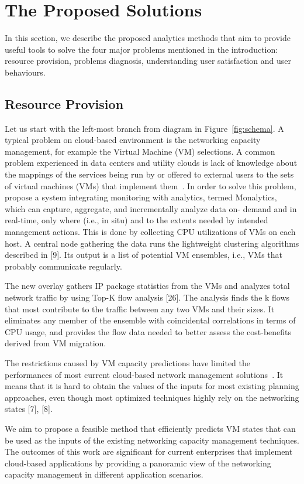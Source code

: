 \section{The Proposed Solutions}
In this section, we describe the proposed analytics methods that aim to provide useful tools to solve the four major problems mentioned in the introduction: resource provision, problems diagnosis, understanding user satisfaction and user behaviours.

\subsection{Resource Provision}
Let us start with the left-most branch from diagram in Figure~\ref{fig:schema}. A typical problem on cloud-based environment is the networking capacity management, for example the Virtual Machine (VM) selections. A common problem experienced in data centers and utility clouds is lack of knowledge about the mappings of the services being run by or offered to external users to the sets of virtual machines (VMs) that implement them~\cite{Wang2011}. In order to solve this problem,  propose a system integrating monitoring with analytics, termed Monalytics, which can capture, aggregate, and incrementally analyze data on- demand and in real-time, only where (i.e., in situ) and to the extents needed by intended management actions. This is done by collecting CPU utilizations of VMs on each host. A central node gathering the data runs the lightweight clustering algorithms described in [9]. Its output is a list of potential VM ensembles, i.e., VMs that probably communicate regularly. 


The new overlay gathers IP package statistics from the VMs and analyzes total network traffic by using Top-K flow analysis [26]. The analysis finds the k flows that most contribute to the traffic between any two VMs and their sizes. It eliminates any member of the ensemble with coincidental correlations in terms of CPU usage, and provides the flow data needed to better assess the cost-benefits derived from VM migration.

 
 
 The restrictions caused by VM capacity predictions have limited the performances of most current cloud-based network management solutions~\cite{Sun2016}. It means that it is hard to obtain the values of the inputs for most existing planning approaches, even though most optimized techniques highly rely on the networking states [7], [8]. 
 
 We aim to propose a feasible method that efficiently predicts VM states that can be used as the inputs of the existing networking capacity management techniques. The outcomes of this work are significant for current enterprises that implement cloud-based applications by providing a panoramic view of the networking capacity management in different application scenarios.
 
